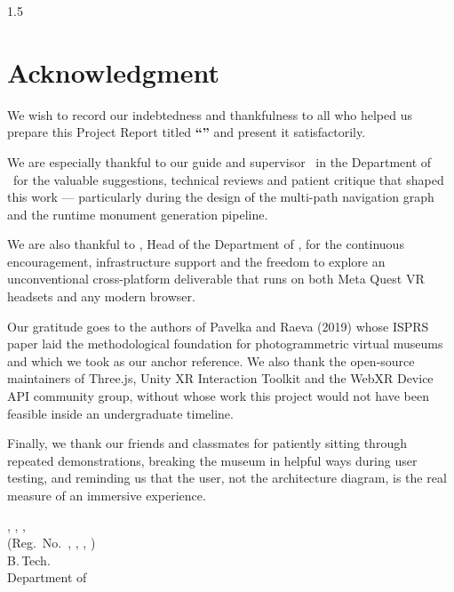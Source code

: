\newpage
{}
\thispagestyle{empty}
\begin{spacing}{1.5}

\chapter*{Acknowledgment}

We wish to record our indebtedness and thankfulness to all who helped us prepare this Project Report titled \textbf{``\vtitle''} and present it satisfactorily.

We are especially thankful to our guide and supervisor \vguide\ in the Department of \vdept\ for the valuable suggestions, technical reviews and patient critique that shaped this work — particularly during the design of the multi-path navigation graph and the runtime monument generation pipeline.

We are also thankful to \vhod, Head of the Department of \vdept, for the continuous encouragement, infrastructure support and the freedom to explore an unconventional cross-platform deliverable that runs on both Meta Quest VR headsets and any modern browser.

Our gratitude goes to the authors of Pavelka and Raeva (2019) whose ISPRS paper laid the methodological foundation for photogrammetric virtual museums and which we took as our anchor reference. We also thank the open-source maintainers of Three.js, Unity XR Interaction Toolkit and the WebXR Device API community group, without whose work this project would not have been feasible inside an undergraduate timeline.

Finally, we thank our friends and classmates for patiently sitting through repeated demonstrations, breaking the museum in helpful ways during user testing, and reminding us that the user, not the architecture diagram, is the real measure of an immersive experience.\\[1cm]

\begin{flushright}
\vnameone, \vnametwo, \vnamethree, \vnamefour\\
(Reg.\ No.\ \vregisternumberone, \vregisternumbertwo, \vregisternumberthree, \vregisternumberfour)\\
B.\,Tech.\\
Department of \vdept\\
\vcollege
\end{flushright}

\end{spacing}
